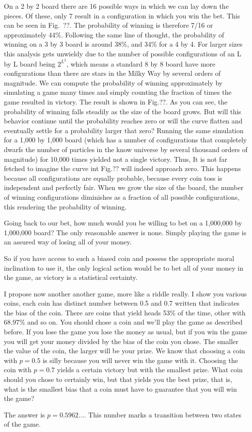 On a 2 by 2 board there are 16 possible ways in which we can lay down the
pieces. Of these, only 7 result in a configuration in which you win the bet.
This can be seen in Fig.~??. The probability of winning is therefore 7/16 or
approximately 44\%. Following the same line of thought, the probability of
winning on a 3 by 3 board is around 38\%, and 34\% for a 4 by 4. For larger
sizes this analysis gets unwieldy due to the number of possible configurations
of an L by L board being $2^{L^2}$, which means a standard 8 by 8 board have
more configurations than there are stars in the Milky Way by several orders of
magnitude. We can compute the probability of winning approximately by
simulating a game many times and simply counting the fraction of times the game
resulted in victory. The result is shown in Fig.??. As you can see, the
probability of winning falls steadily as the size of the board grows. But will
this behavior continue until the probability reaches zero or will the curve
flatten and eventually settle for a probability larger that zero? Running the
same simulation for a 1,000 by 1,000 board (which has a number of
configurations that completely dwarfs the number of particles in the know
universe by several thousand orders of magnitude) for 10,000 times yielded not
a single victory. Thus, It is not far fetched to imagine the curve int Fig.??
will indeed approach zero.
This happens because all configurations are equally probable, because every
coin toss is independent and perfectly fair. When we grow the size of the
board, the number of winning configurations diminishes as a fraction of all
possible configurations, this rendering the probability of winning.

Going back to our bet, how much would you be willing to bet on a 1,000,000 by
1,000,000 board? The only reasonable answer is none. Simply playing the game 
is an assured way of losing all of your money.


So if you have access to such a biased coin and possess the appropriate moral
inclination to use it, the only logical action would be to bet all of your
money in the game, as victory is a statistical certainty. 

I propose now another another game, more like a riddle really. I show you
various coins, each coin has distinct number between 0.5 and 0.7 written that
indicates the bias of the coin. There are coins that yield heads 53\% of the
time, other with 68.97\% and so on. You should chose a coin and we'll play the
game as described before. If you lose the game you lose the money as usual, but
if you win the game you will get your money divided by the bias of the coin you
chose. The smaller the value of the coin, the larger will be your prize. We
know that choosing a coin with $p=0.5$ is silly because you will never win
the game with it. Choosing the coin with $p=0.7$ yields a certain victory but
with the smallest prize. What coin should you chose to certainly win, but
that yields you the best prize, that is, what is the smallest bias that a
coin must have to guarantee that you will win the game?

The answer is $p=0.5962...$. This number marks a transition between two states
of the game.
